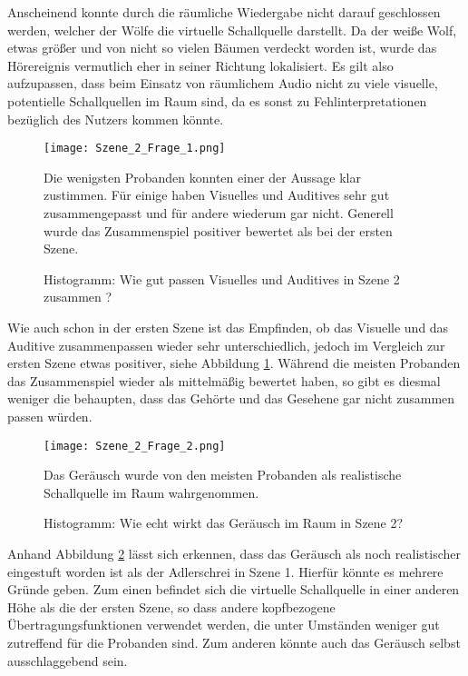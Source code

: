 Anscheinend konnte durch die räumliche Wiedergabe nicht darauf geschlossen werden, welcher der Wölfe die virtuelle Schallquelle darstellt. Da der weiße Wolf, etwas größer und von nicht so vielen Bäumen verdeckt worden ist, wurde das Hörereignis vermutlich eher in seiner Richtung lokalisiert. Es gilt also aufzupassen, dass beim Einsatz von räumlichem Audio nicht zu viele visuelle, potentielle Schallquellen im Raum sind, da es sonst zu Fehlinterpretationen bezüglich des Nutzers kommen könnte. 

\begin{figure}[H]
\centering
\texttt{[image: Szene\_2\_Frage\_1.png]}
\caption{Histogramm: Wie gut passen Visuelles und Auditives in Szene 2 zusammen ?}
Die wenigsten Probanden konnten einer der Aussage klar zustimmen. Für einige haben Visuelles und Auditives sehr gut zusammengepasst und für andere wiederum gar nicht. Generell wurde das Zusammenspiel positiver bewertet als bei der ersten Szene.
\label{fig:Szene_2_Frage1}
\end{figure} 

\vspace*{20pt}

Wie auch schon in der ersten Szene ist das Empfinden, ob das Visuelle und das Auditive zusammenpassen wieder sehr unterschiedlich, jedoch im Vergleich zur ersten Szene etwas positiver, siehe Abbildung \ref{fig:Szene_2_Frage1}. Während die meisten Probanden das Zusammenspiel wieder als mittelmäßig bewertet haben, so gibt es diesmal weniger die behaupten, dass das Gehörte und das Gesehene gar nicht zusammen passen würden. 

 \begin{figure}[H]
\centering
\texttt{[image: Szene\_2\_Frage\_2.png]}
\caption{Histogramm: Wie echt wirkt das Geräusch im Raum in Szene 2?}
Das Geräusch wurde von den meisten Probanden als realistische Schallquelle im Raum wahrgenommen.
\label{fig:Szene_2_Frage2}
\end{figure} 

\vspace*{20pt}


Anhand Abbildung \ref{fig:Szene_2_Frage2} lässt sich erkennen, dass das Geräusch als noch realistischer eingestuft worden ist als der Adlerschrei in Szene 1. Hierfür könnte es mehrere Gründe geben. Zum einen befindet sich die virtuelle Schallquelle in einer anderen Höhe als die der ersten Szene, so dass andere kopfbezogene Übertragungsfunktionen verwendet werden, die unter Umständen weniger gut zutreffend für die Probanden sind. Zum anderen könnte auch das Geräusch selbst ausschlaggebend sein.\\


